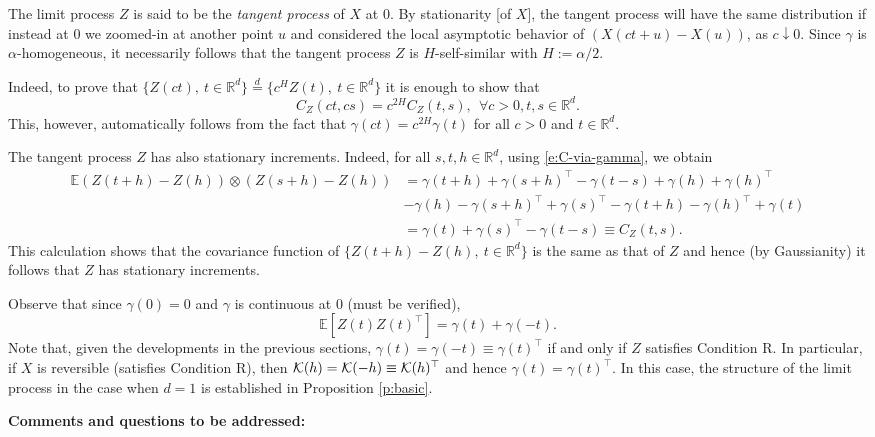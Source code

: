 \documentclass[11pt]{article}
\def\E{\mathbb E}
\def\R{\mathbb R}
\def\Rd{\R^d}
\def\eqd{\stackrel{d}{=}}
\theoremstyle{plain}
\theoremstyle{definition}
\theoremstyle{condition}
\theoremstyle{remark}
\begin{document}
The limit process $Z$ is said to be the {\em tangent process} of $X$ at $0$. By stationarity [of $X$], the tangent process
will have the same distribution if instead at $0$ we zoomed-in at another point $u$ and considered the local asymptotic behavior of $(X(ct+u) - X(u))$,
as $c\downarrow 0$.  Since $\gamma$ is $\alpha$-homogeneous, it necessarily follows that the tangent process $Z$ is $H$-self-similar with $H:= \alpha/2$.

Indeed, to prove that $\{Z(ct),\ t\in\Rd\}\eqd\{c^H Z(t),\ t\in\Rd\}$ it is enough to show that
$$
C_Z(ct,cs) = c^{2H}C_Z(t,s),\ \ \forall c>0,t,s\in\Rd.
$$ 
This, however, automatically follows from the fact that $\gamma(ct) = c^{2H} \gamma(t)$ for all $c>0$ and $t\in\Rd$.

The tangent process $Z$ has also stationary increments.  Indeed, for all $s,t,h\in\Rd$, using \eqref{e:C-via-gamma},
we obtain
\begin{align*}
\E (Z(t+h) - Z(h))\otimes (Z(s+h) - Z(h)) &= \gamma(t+h) + \gamma(s+h)^\top - \gamma(t-s) +\gamma(h) +\gamma(h)^\top \\
& - \gamma(h) -\gamma(s+h)^\top + \gamma(s)^\top -\gamma(t+h) -\gamma(h)^\top + \gamma(t)\\
&= \gamma(t) + \gamma(s)^\top - \gamma(t-s) \equiv C_Z(t,s).
\end{align*}
This calculation shows that the covariance function of $\{ Z(t+h) - Z(h),\ t\in \Rd\}$ is the same as that of $Z$ and hence (by Gaussianity)
it follows that $Z$ has stationary increments.

Observe that since $\gamma(0) = 0$ and $\gamma$ is continuous at $0$ (must be verified),
$$
\E[Z(t)Z(t)^\top] = \gamma(t) + \gamma(-t).
$$
Note that, given the developments in the previous sections, $\gamma(t)=\gamma(-t) \equiv \gamma(t)^\top$ if and only if $Z$ satisfies Condition R.
In particular, if $X$ is reversible (satisfies Condition R), then ${\cal K}(h) = {\cal K}(-h) \equiv {\cal K}(h)^\top$ and hence $\gamma(t) = \gamma(t)^\top$.
In this case, the structure of the limit process in the case when $d=1$ is established in Proposition \ref{p:basic}.


{\bf Comments and questions to be addressed:}
\end{document}

